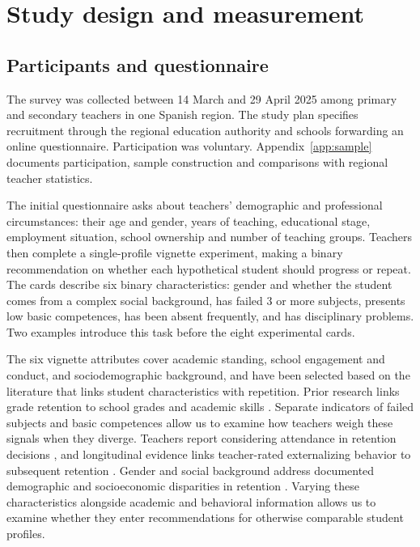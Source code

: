 \section{Study design and measurement}\label{sec:design}
\subsection{Participants and questionnaire}
The survey was collected between 14 March and 29 April 2025 among primary and secondary teachers in one Spanish region. The study plan specifies recruitment through the regional education authority and schools forwarding an online questionnaire. Participation was voluntary. Appendix~\ref{app:sample} documents participation, sample construction and comparisons with regional teacher statistics.

The initial questionnaire asks about teachers' demographic and professional circumstances: their age and gender, years of teaching, educational stage, employment situation, school ownership and number of teaching groups. Teachers then complete a single-profile vignette experiment, making a binary recommendation on whether each hypothetical student should progress or repeat. The cards describe six binary characteristics: gender and whether the student comes from a complex social background, has failed 3 or more subjects, presents low basic competences, has been absent frequently, and has disciplinary problems. Two examples introduce this task before the eight experimental cards.

The six vignette attributes cover academic standing, school engagement and conduct, and sociodemographic background, and have been selected based on the literature that links student characteristics with repetition. Prior research links grade retention to school grades \citep{klapprothschaltz2015retained} and academic skills \citep{davoudzadeh2015readiness}. Separate indicators of failed subjects and basic competences allow us to examine how teachers weigh these signals when they diverge. Teachers report considering attendance in retention decisions \citep{santosmonteiro2024retention}, and longitudinal evidence links teacher-rated externalizing behavior to subsequent retention \citep{mattison2018behavior}. Gender and social background address documented demographic and socioeconomic disparities in retention \citep{gonzalezbetancor2016retention,klapprothschaltz2015retained}. Varying these characteristics alongside academic and behavioral information allows us to examine whether they enter recommendations for otherwise comparable student profiles.

